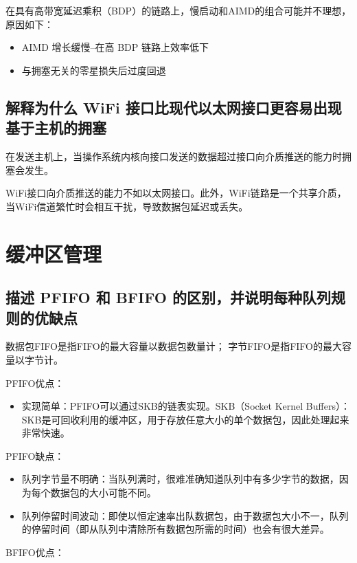 在具有高带宽延迟乘积（BDP）的链路上，慢启动和AIMD的组合可能并不理想，原因如下：

\begin{itemize}
	\item AIMD 增长缓慢--在高 BDP 链路上效率低下
	\item 与拥塞无关的零星损失后过度回退
\end{itemize}

\subsection{解释为什么 WiFi 接口比现代以太网接口更容易出现基于主机的拥塞}

在发送主机上，当操作系统内核向接口发送的数据超过接口向介质推送的能力时拥塞会发生。

WiFi接口向介质推送的能力不如以太网接口。此外，WiFi链路是一个共享介质，当WiFi信道繁忙时会相互干扰，导致数据包延迟或丢失。

\section{缓冲区管理}

\subsection{描述 PFIFO 和 BFIFO 的区别，并说明每种队列规则的优缺点}

数据包FIFO是指FIFO的最大容量以数据包数量计；
字节FIFO是指FIFO的最大容量以字节计。

PFIFO优点：

\begin{itemize}
	\item 实现简单：PFIFO可以通过SKB的链表实现。SKB（Socket Kernel Buffers）：SKB是可回收利用的缓冲区，用于存放任意大小的单个数据包，因此处理起来非常快速。
\end{itemize}

PFIFO缺点：

\begin{itemize}
	\item 队列字节量不明确：当队列满时，很难准确知道队列中有多少字节的数据，因为每个数据包的大小可能不同。
	\item 队列停留时间波动：即使以恒定速率出队数据包，由于数据包大小不一，队列的停留时间（即从队列中清除所有数据包所需的时间）也会有很大差异。

\end{itemize}

BFIFO优点：

